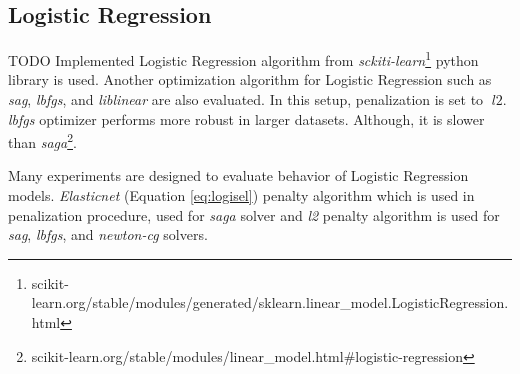 \subsection{Logistic Regression}
{\color{green}TODO}
Implemented Logistic Regression algorithm from \textit{sckiti-learn}\footnote{scikit-learn.org/stable/modules/generated/sklearn.linear\_model.LogisticRegression.html} python library is used.
Another optimization algorithm for Logistic Regression such as \textit{sag}, \textit{lbfgs}, and \textit{liblinear} are also evaluated. In this setup, penalization is set to $\; l2$. \textit{lbfgs} optimizer performs more robust in larger datasets. Although, it is slower than \textit{saga}\footnote{scikit-learn.org/stable/modules/linear\_model.html\#logistic-regression}. 


Many experiments are designed to evaluate behavior of Logistic Regression models. 	 \textit{Elasticnet} (Equation \ref{eq:logisel}) penalty algorithm which is used in penalization procedure, used for \textit{saga} solver and \textit{l2} penalty algorithm is used for \textit{sag}, \textit{lbfgs}, and \textit{newton-cg} solvers. 

